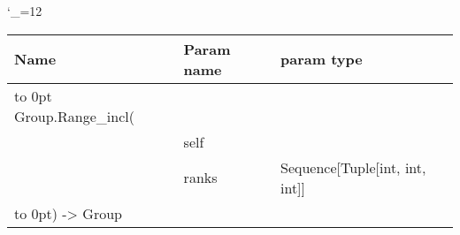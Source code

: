 \begingroup \catcode`\_=12 \tt
\begin{tabular}{lll}
\toprule
\textrm{Name}&\textrm{Param name}&\textrm{param type}\\
\midrule
\hbox to 0pt {Group.Range_incl(\hss}\\
& self\\
& ranks & Sequence[Tuple[int, int, int]]\\
\hbox to 0pt{) -> Group\hss}\\
\bottomrule
\end{tabular}
\endgroup

